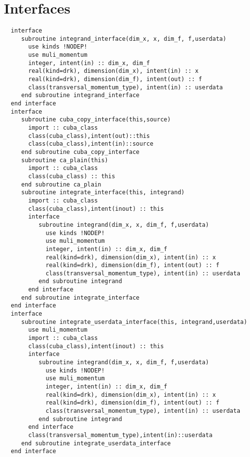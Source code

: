 \section{Interfaces}
\begin{Verbatim}
  interface
     subroutine integrand_interface(dim_x, x, dim_f, f,userdata)
       use kinds !NODEP!
       use muli_momentum
       integer, intent(in) :: dim_x, dim_f
       real(kind=drk), dimension(dim_x), intent(in) :: x
       real(kind=drk), dimension(dim_f), intent(out) :: f
       class(transversal_momentum_type), intent(in) :: userdata
     end subroutine integrand_interface
  end interface
  interface
     subroutine cuba_copy_interface(this,source)
       import :: cuba_class
       class(cuba_class),intent(out)::this
       class(cuba_class),intent(in)::source
     end subroutine cuba_copy_interface
     subroutine ca_plain(this)
       import :: cuba_class
       class(cuba_class) :: this 
     end subroutine ca_plain
     subroutine integrate_interface(this, integrand)
       import :: cuba_class
       class(cuba_class),intent(inout) :: this  
       interface
          subroutine integrand(dim_x, x, dim_f, f,userdata)
            use kinds !NODEP!
            use muli_momentum
            integer, intent(in) :: dim_x, dim_f
            real(kind=drk), dimension(dim_x), intent(in) :: x
            real(kind=drk), dimension(dim_f), intent(out) :: f
            class(transversal_momentum_type), intent(in) :: userdata
          end subroutine integrand
       end interface
     end subroutine integrate_interface
  end interface
  interface
     subroutine integrate_userdata_interface(this, integrand,userdata)
       use muli_momentum
       import :: cuba_class
       class(cuba_class),intent(inout) :: this  
       interface
          subroutine integrand(dim_x, x, dim_f, f,userdata)
            use kinds !NODEP!
            use muli_momentum
            integer, intent(in) :: dim_x, dim_f
            real(kind=drk), dimension(dim_x), intent(in) :: x
            real(kind=drk), dimension(dim_f), intent(out) :: f
            class(transversal_momentum_type), intent(in) :: userdata
          end subroutine integrand
       end interface
       class(transversal_momentum_type),intent(in)::userdata
     end subroutine integrate_userdata_interface
  end interface
\end{Verbatim}
\Methods
{}

